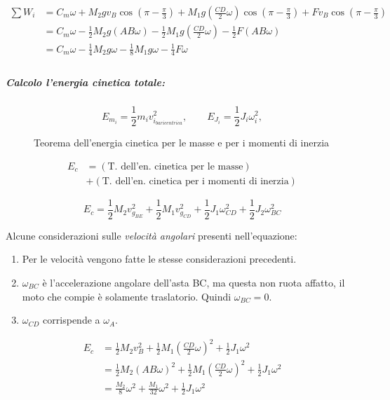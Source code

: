 \documentclass[main.tex]{subfiles}
\begin{document}
\begin{align*}
  \sum W_i &= C_m\omega + M_2g v_{B}\cos(\pi - \frac{\pi}{3}) + M_1g( \frac{CD}{2}\omega)\cos(\pi - \frac{\pi}{3}) + F v_{B}\cos(\pi - \frac{\pi}{3}) \\
  &= C_m\omega - \frac{1}{2} M_2g (AB\omega) - \frac{1}{2}M_1g( \frac{CD}{2}\omega) - \frac{1}{2}F (AB\omega) \\
  &= C_m\omega - \frac{1}{4} M_2g \omega - \frac{1}{8}M_1g\omega - \frac{1}{4}F \omega \\
\end{align*}

\subparagraph{Calcolo l'energia cinetica totale:}
\begin{figure}[H]
\[
  E_{m_i} = \frac{1}{2}m_iv_{i_{baricentrica}}^2, \qquad E_{J_i} = \frac{1}{2}J_i\omega_{i}^2,
\]
\caption{Teorema dell'energia cinetica per le masse e per i momenti di inerzia}
\end{figure}

\begin{align*}
  E_c &= (\text{T. dell'en. cinetica per le masse})\\ &+ (\text{T. dell'en. cinetica per i momenti di inerzia})
\end{align*}

\[
  E_c = \frac{1}{2}M_2 v_{g_{BE}}^2 + \frac{1}{2}M_1 v_{g_{CD}}^2 + \frac{1}{2}J_1\omega_{CD}^2 +\frac{1}{2}J_2\omega_{BC}^2
\]

Alcune considerazioni sulle \textit{velocità angolari} presenti nell'equazione:

\begin{enumerate}
  \item Per le velocità vengono fatte le stesse considerazioni precedenti.
  \item $\omega_{BC}$ è l'accelerazione angolare dell'asta BC, ma questa non ruota affatto, il moto che compie è solamente traslatorio. Quindi $\omega_{BC} = 0$.
  \item $\omega_{CD}$ corrispende a $\omega_A$.
\end{enumerate}

\begin{align*}
  E_c &= \frac{1}{2}M_2 v_B^2 + \frac{1}{2}M_1 ( \frac{CD}{2}\omega)^2 + \frac{1}{2}J_1\omega^2 \\
      &= \frac{1}{2}M_2 (AB\omega)^2 + \frac{1}{2}M_1 ( \frac{CD}{2}\omega)^2 + \frac{1}{2}J_1\omega^2 \\
      &= \frac{M_2}{8} \omega^2 + \frac{M_1}{32}\omega^2 + \frac{1}{2}J_1\omega^2
\end{align*}
\end{document}
